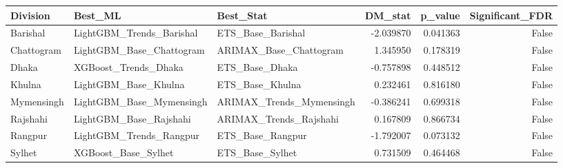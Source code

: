\begin{tabular}{lllrrr}
\toprule
Division & Best_ML & Best_Stat & DM_stat & p_value & Significant_FDR \\
\midrule
Barishal & LightGBM_Trends_Barishal & ETS_Base_Barishal & -2.039870 & 0.041363 & False \\
Chattogram & LightGBM_Base_Chattogram & ARIMAX_Base_Chattogram & 1.345950 & 0.178319 & False \\
Dhaka & XGBoost_Trends_Dhaka & ETS_Base_Dhaka & -0.757898 & 0.448512 & False \\
Khulna & LightGBM_Base_Khulna & ETS_Base_Khulna & 0.232461 & 0.816180 & False \\
Mymensingh & LightGBM_Base_Mymensingh & ARIMAX_Trends_Mymensingh & -0.386241 & 0.699318 & False \\
Rajshahi & LightGBM_Base_Rajshahi & ARIMAX_Trends_Rajshahi & 0.167809 & 0.866734 & False \\
Rangpur & LightGBM_Trends_Rangpur & ETS_Base_Rangpur & -1.792007 & 0.073132 & False \\
Sylhet & XGBoost_Base_Sylhet & ETS_Base_Sylhet & 0.731509 & 0.464468 & False \\
\bottomrule
\end{tabular}
